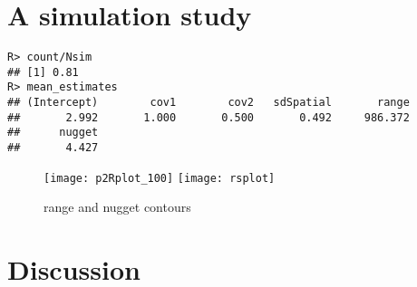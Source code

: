 \documentclass{article}\usepackage[]{graphicx}\usepackage[]{color}
\makeatletter
\newenvironment{kframe}{%
 \def\at@end@of@kframe{}%
 \ifinner\ifhmode%
  \def\at@end@of@kframe{\end{minipage}}%
  \begin{minipage}{\columnwidth}%
 \fi\fi%
 \def\FrameCommand##1{\hskip\@totalleftmargin \hskip-\fboxsep
 \colorbox{shadecolor}{##1}\hskip-\fboxsep
     \hskip-\linewidth \hskip-\@totalleftmargin \hskip\columnwidth}%
 \MakeFramed {\advance\hsize-\width
   \@totalleftmargin\z@ \linewidth\hsize
   \@setminipage}}%
 {\par\unskip\endMakeFramed%
 \at@end@of@kframe}
\newenvironment{knitrout}{}{} %
\makeatother
\begin{document}
\section{A simulation study}









\begin{knitrout}
\color{fgcolor}\begin{kframe}
\begin{verbatim}
R> count/Nsim
## [1] 0.81
R> mean_estimates
## (Intercept)        cov1        cov2   sdSpatial       range 
##       2.992       1.000       0.500       0.492     986.372 
##      nugget 
##       4.427
\end{verbatim}
\end{kframe}
\end{knitrout}




\begin{knitrout}
\color{fgcolor}\begin{figure}

{\centering \texttt{[image: p2Rplot\_100]} 
\texttt{[image: rsplot]} 

}

\caption[range and nugget contours]{range and nugget contours}\label{fig:showgraphs}
\end{figure}

\end{knitrout}





\section{Discussion}










  
  
\end{document}
